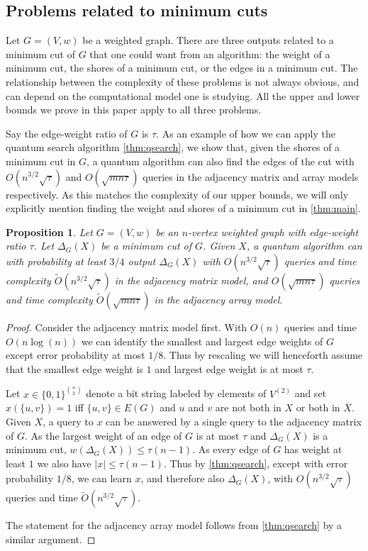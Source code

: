 \documentclass[10pt,a4paper]{article}
\newcommand{\tO}{\tilde O}
\newcommand{\1}{\mathbf{1}}
\newtheorem{proposition}[theorem]{Proposition}
\theoremstyle{definition}
\begin{document}
\subsection{Problems related to minimum cuts}
Let $G=(V,w)$ be a weighted graph.  There are three outputs related to a minimum cut of $G$ that one could want 
from an algorithm: the weight of a minimum cut, the shores of a minimum cut, or the edges in a minimum cut.
The relationship between the complexity of these problems is not always obvious, and can depend on the computational 
model one is studying.  All the upper and lower bounds we prove in this paper apply to all three problems.

Say the edge-weight ratio of $G$ is $\tau$.
As an example of how we can apply the quantum search algorithm \cref{thm:qsearch}, 
we show that, given the shores of a minimum cut in $G$, a quantum algorithm can also find the edges of the cut with 
$O(n^{3/2} \sqrt{\tau})$ and $O(\sqrt{mn \tau})$ queries in the adjacency matrix and array models respectively.  As this matches the complexity of 
our upper bounds, we will only explicitly mention finding the weight and shores of a minimum cut
in \cref{thm:main}.  

\begin{proposition}
Let $G = (V,w)$ be an $n$-vertex weighted graph with edge-weight ratio $\tau$.   Let $\Delta_G(X)$ be a minimum cut of $G$.  
Given $X$, a quantum algorithm can with probability at least $3/4$ output $\Delta_G(X)$ with $O(n^{3/2}\sqrt{\tau})$ queries and time complexity $\tO(n^{3/2}\sqrt{\tau})$ in the adjacency matrix model, and $O(\sqrt{mn\tau})$ queries and time complexity $\tO(\sqrt{mn\tau})$ in the adjacency array model.
\end{proposition}

\begin{proof}
Consider the adjacency matrix model first.  With $O(n)$ queries and time $O(n \log(n))$ we can identify the smallest and largest edge weights of $G$ except error probability at most $1/8$.  Thus by rescaling we will 
henceforth assume that the smallest edge weight is $1$ and largest edge weight is at most $\tau$.

Let $x \in \{0,1\}^{\binom{n}{2}}$ denote a bit string labeled by elements of $V^{(2)}$ and set $x(\{u,v\}) = 1$ iff $\{u,v\} \in E(G)$ and $u$ and $v$ are not both in 
$X$ or both in $\overline{X}$.  Given $X$, a query to $x$ can be answered by a single query to the adjacency matrix of $G$.  As the largest weight of an edge of $G$ is at most $\tau$ and $\Delta_G(X)$ is a minimum cut, 
$w(\Delta_G(X)) \le \tau(n-1)$.  As every edge of $G$ has weight at least $1$ we also have $|x| \le \tau (n-1)$.  Thus by \cref{thm:qsearch}, except with error probability $1/8$, we can learn $x$, and therefore also $\Delta_G(X)$, with 
$O(n^{3/2}\sqrt{\tau})$ queries and time $\tO(n^{3/2}\sqrt{\tau})$.

The statement for the adjacency array model follows from \cref{thm:qsearch} by a similar argument. 
\end{proof}
\end{document}
